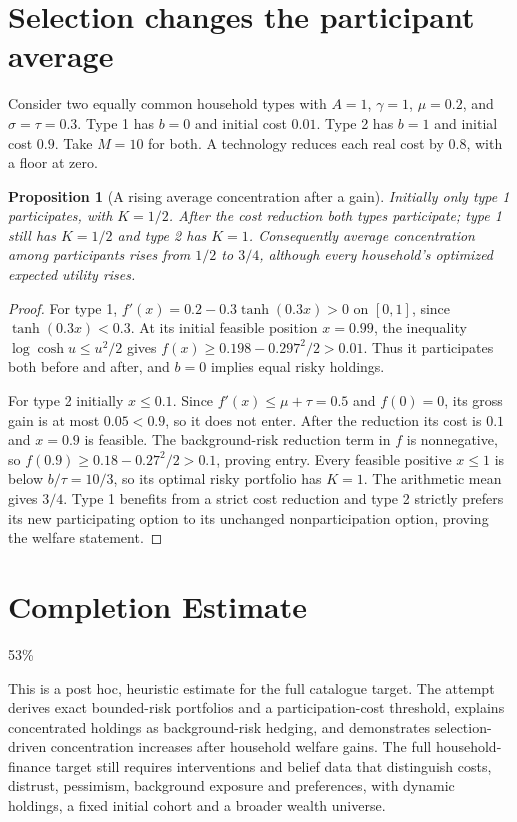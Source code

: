 \documentclass[11pt,a4paper]{article}
\newtheorem{proposition}[theorem]{Proposition}
\theoremstyle{definition}
\theoremstyle{remark}
\begin{document}
\section{Selection changes the participant average}
Consider two equally common household types with $A=1$, $\gamma=1$, $\mu=0.2$, and $\sigma=\tau=0.3$. Type 1 has $b=0$ and initial cost $0.01$. Type 2 has $b=1$ and initial cost $0.9$. Take $M=10$ for both. A technology reduces each real cost by $0.8$, with a floor at zero.

\begin{proposition}[A rising average concentration after a gain]
Initially only type 1 participates, with $K=1/2$. After the cost reduction both types participate; type 1 still has $K=1/2$ and type 2 has $K=1$. Consequently average concentration among participants rises from $1/2$ to $3/4$, although every household's optimized expected utility rises.
\end{proposition}
\begin{proof}
For type 1, $f'(x)=0.2-0.3\tanh(0.3x)>0$ on $[0,1]$, since $\tanh(0.3x)<0.3$. At its initial feasible position $x=0.99$, the inequality $\log\cosh u\leq u^2/2$ gives $f(x)\geq0.198-0.297^2/2>0.01$. Thus it participates both before and after, and $b=0$ implies equal risky holdings.

For type 2 initially $x\leq0.1$. Since $f'(x)\leq\mu+\tau=0.5$ and $f(0)=0$, its gross gain is at most $0.05<0.9$, so it does not enter. After the reduction its cost is $0.1$ and $x=0.9$ is feasible. The background-risk reduction term in $f$ is nonnegative, so $f(0.9)\geq0.18-0.27^2/2>0.1$, proving entry. Every feasible positive $x\leq1$ is below $b/\tau=10/3$, so its optimal risky portfolio has $K=1$. The arithmetic mean gives $3/4$. Type 1 benefits from a strict cost reduction and type 2 strictly prefers its new participating option to its unchanged nonparticipation option, proving the welfare statement.
\end{proof}

\section{Completion Estimate}
53\%

This is a post hoc, heuristic estimate for the full catalogue target.
The attempt derives exact bounded-risk portfolios and a participation-cost threshold, explains concentrated holdings as background-risk hedging, and demonstrates selection-driven concentration increases after household welfare gains. The full household-finance target still requires interventions and belief data that distinguish costs, distrust, pessimism, background exposure and preferences, with dynamic holdings, a fixed initial cohort and a broader wealth universe.
\end{document}
